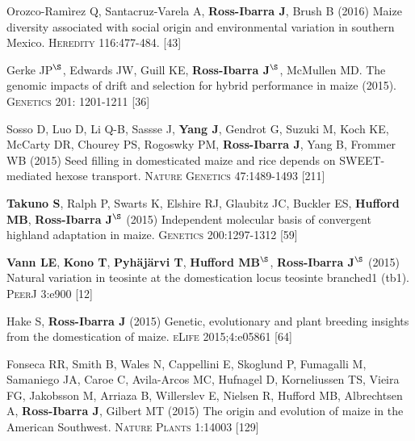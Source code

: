 \documentclass[letterpaper,10pt]{article}
\begin{document}
\begin{etaremune}
\item Orozco-Ram\`{i}rez Q, Santacruz-Varela A, {\bf Ross-Ibarra J}, Brush B (2016) Maize diversity associated with social origin and environmental variation in southern Mexico. \textsc{Heredity} 116:477-484.
 [43]\\


\item Gerke JP$^\S$, Edwards JW, Guill KE, {\bf Ross-Ibarra J}$^\S$, McMullen MD.  The genomic impacts of drift and selection for hybrid performance in maize (2015). \textsc{Genetics}  201: 1201-1211
 [36]\\


\item Sosso D, Luo D, Li Q-B, Sassse J, {\bf Yang J}, Gendrot G, Suzuki M, Koch KE, McCarty DR, Chourey PS, Rogoswky PM, {\bf Ross-Ibarra J}, Yang B, Frommer WB (2015) Seed filling in domesticated maize and rice depends on SWEET-mediated hexose transport. \textsc{Nature Genetics} 47:1489-1493
 [211]\\


\item {\bf Takuno S}, Ralph P, Swarts K, Elshire RJ, Glaubitz JC, Buckler ES, {\bf Hufford MB}, {\bf Ross-Ibarra J}$^\S$ (2015) Independent molecular basis of convergent highland adaptation in maize. \textsc{Genetics} 200:1297-1312
 [59]\\


\item {\bf Vann LE}, {\bf Kono T}, {\bf Pyh\"aj\"arvi T}, {\bf Hufford MB}$^\S$, {\bf Ross-Ibarra J}$^\S$ (2015) Natural variation in teosinte at the domestication locus teosinte branched1 (tb1). \textsc{PeerJ} 3:e900
 [12]\\


\item Hake S, {\bf Ross-Ibarra J} (2015) Genetic, evolutionary and plant breeding insights from the domestication of maize. \textsc{eLife}  2015;4:e05861
 [64]\\


\item Fonseca RR, Smith B, Wales N, Cappellini E, Skoglund P, Fumagalli M, Samaniego JA, Caroe C, Avila-Arcos MC, Hufnagel D, Korneliussen TS, Vieira FG, Jakobsson M, Arriaza B, Willerslev E, Nielsen R, Hufford MB, Albrechtsen A,  {\bf Ross-Ibarra J}, Gilbert MT (2015) The origin and evolution of maize in the American Southwest. \textsc{Nature Plants} 1:14003
 [129]\\


\end{etaremune}
\end{document}
